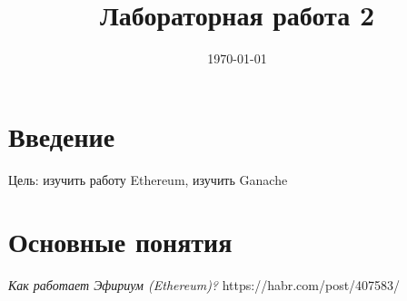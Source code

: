 \documentclass{article}
\begin{document}
\title{Лабораторная работа 2}

\date{\today}
\maketitle


\section{Введение}

Цель: изучить работу Ethereum, изучить Ganache


\section{Основные понятия}






\begin{thebibliography}{9}

	  \emph{Как работает Эфириум (Ethereum)?}
	  https://habr.com/post/407583/

\end{thebibliography}
\end{document}
